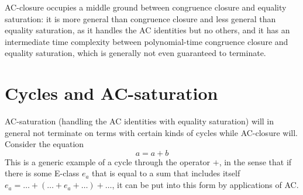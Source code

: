 \documentclass[12pt,a4paper,twoside,openright]{report}
\numberwithin{equation}{chapter}		%
\numberwithin{figure}{chapter}			%
\numberwithin{table}{chapter}			%
\theoremstyle{definition}
\theoremstyle{plain}
\begin{document}
\begin{center}
\end{center}

AC-closure occupies a middle ground between congruence closure and equality saturation: it is more general than congruence closure and less general than equality saturation, as it handles the AC identities but no others, and it has an intermediate time complexity between polynomial-time congruence closure and equality saturation, which is generally not even guaranteed to terminate.

\section{Cycles and AC-saturation} \label{accycles}
AC-saturation (handling the AC identities with equality saturation) will in general not terminate on terms with certain kinds of cycles while AC-closure will. Consider the equation
\begin{equation}
	a = a + b
\end{equation}
This is a generic example of a cycle through the operator $+$, in the sense that if there is some E-class $e_a$ that is equal to a sum that includes itself $e_a = \ldots + (\ldots + e_a + \ldots) + \ldots$, it can be put into this form by applications of AC.
\end{document}

